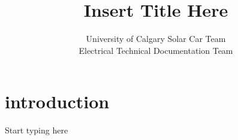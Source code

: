 \documentclass[titlepage]{article}
\title{Insert Title Here}
\author{University of Calgary Solar Car Team\\
        Electrical Technical Documentation Team}
\date{}
\begin{document}
    \maketitle
    \section{introduction}
    Start typing here

    
    
\end{document}

